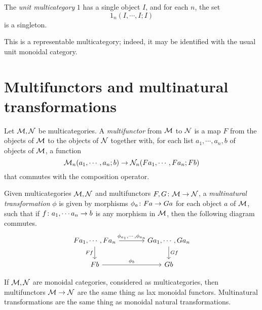 \documentclass{report}[11pt]
\begin{document}
\begin{definition}
  The \emph{unit multicategory} $1$ has a single object $I$, and for each $n$, the set
  \[
    1_n(I,\cdots,I;I)
    \]
  is a singleton.

  This is a representable multicategory; indeed, it may be identified with the usual unit monoidal category.
\end{definition}

\section{Multifunctors and multinatural transformations}

\begin{definition}
  Let $\mathcal M,\mathcal N$ be multicategories.  
  A \emph{multifunctor} from $\mathcal M$ to $\mathcal N$ is a map $F$ from the objects of $\mathcal M$ to the objects of $\mathcal N$ together with, for each list $a_1,\cdots,a_n,b$ of objects of $\mathcal M$, a function
  \[
    \mathcal M_n(a_1,\cdots,a_n;b) \to \mathcal N_n(F a_1,\cdots,F a_n; F b)
    \]
  that commutes with the composition operator.
\end{definition}
  
\begin{definition}
  Given multicategories $\mathcal M,\mathcal N$ and multifunctors $F,G\colon \mathcal M \to \mathcal N$, a \emph{multinatural transformation} $\phi$ is given by morphisms $\phi_a \colon F a \to G a$ for each object $a$ of $\mathcal M$, such that if $f\colon a_1,\cdots a_n\to b$ is any morphism in $\mathcal M$, then the following diagram commutes.
  \[
    \begin{tikzcd}[column sep=36pt]
      Fa_1,\cdots, Fa_n \arrow[r, "{\phi_{a_1},\cdots,\phi_{a_n}}"] \arrow[d, "Ff"']
        & Ga_1,\cdots, Ga_n \arrow[d, "Gf"] \\
      Fb \arrow[r, "\phi_b"]
        & Gb
    \end{tikzcd}
    \]
\end{definition}

\begin{proposition}
  If $\mathcal M,\mathcal N$ are monoidal categories, considered as multicategories, then multifunctors $\mathcal M\to\mathcal N$ are the same thing as lax monoidal functors.  
  Multinatural transformations are the same thing as monoidal natural transformations.
\end{proposition}
\end{document}
